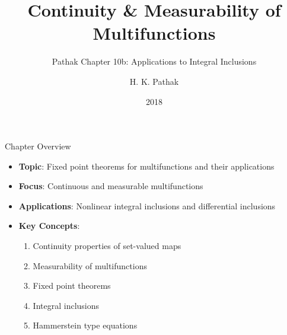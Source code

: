 \documentclass[aspectratio=169,10pt]{beamer}
\title{Continuity \& Measurability of Multifunctions}
\subtitle{Pathak Chapter 10b: Applications to Integral Inclusions}
\author{H. K. Pathak}
\institute{Nonlinear Analysis and Fixed Point Theory}
\date{2018}
\begin{document}
\frame{\titlepage}

\begin{frame}{Chapter Overview}
    \begin{itemize}
        \item \textbf{Topic}: Fixed point theorems for multifunctions and their applications
        \item \textbf{Focus}: Continuous and measurable multifunctions
        \item \textbf{Applications}: Nonlinear integral inclusions and differential inclusions
        \vspace{0.3cm}
        \item \textbf{Key Concepts}:
        \begin{enumerate}
            \item Continuity properties of set-valued maps
            \item Measurability of multifunctions
            \item Fixed point theorems
            \item Integral inclusions
            \item Hammerstein type equations
        \end{enumerate}
    \end{itemize}
\end{frame}
\end{document}
